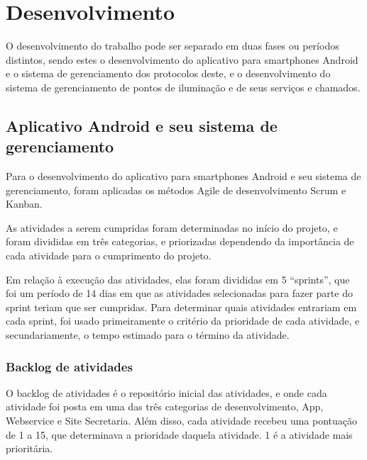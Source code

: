 \documentclass[
	article,			%
	11pt,				%
	oneside,			%
	a4paper,			%
	english,			%
	brazil,				%
	sumario=tradicional
	]{abntex2}
\begin{document}
\section{Desenvolvimento}

O desenvolvimento do trabalho pode ser separado em duas fases ou períodos distintos, sendo estes o desenvolvimento do aplicativo para smartphones Android e o sistema de gerenciamento dos protocolos deste, e o desenvolvimento do sistema de gerenciamento de pontos de iluminação e de seus serviços e chamados.

\subsection{Aplicativo Android e seu sistema de gerenciamento}

Para o desenvolvimento do aplicativo para smartphones Android e seu sistema de gerenciamento, foram aplicadas os métodos Agile de desenvolvimento Scrum e Kanban.

As atividades a serem cumpridas foram determinadas no início do projeto, e foram divididas em três categorias, e priorizadas dependendo da importância de cada atividade para o cumprimento do projeto.

Em relação à execução das atividades, elas foram divididas em 5 “sprints”, que foi um período de 14 dias em que as atividades selecionadas para fazer parte do sprint teriam que ser cumpridas.
Para determinar quais atividades entrariam em cada sprint, foi usado primeiramente o critério da prioridade de cada atividade, e secundariamente, o tempo estimado para o término da atividade.

\subsubsection{Backlog de atividades}

O backlog de atividades é o repositório inicial das atividades, e onde cada atividade foi posta em uma das três categorias de desenvolvimento, App, Webservice e Site Secretaria.
Além disso, cada atividade recebeu uma pontuação de 1 a 15, que determinava a prioridade daquela atividade. 1 é a atividade mais prioritária.
\end{document}
